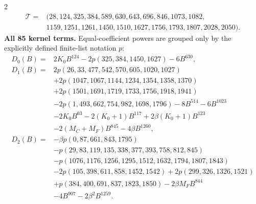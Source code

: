 \documentclass[10pt]{article}
\begin{document}
\begin{multicols}{2}
\[\begin{aligned}
\mathcal T={}&(28,124,325,384,589,630,643,696,846,1073,1082,\\
 &1159,1251,1261,1450,1510,1627,1756,1793,1807,2028,2050).
\end{aligned}
\]
\textbf{All 85 kernel terms.} Equal-coefficient powers are grouped only by
the explicitly defined finite-list notation $p$:
\[
\begin{aligned}
D_0(B)={}&2K_0B^{124}-2p(325,384,1450,1627)-6B^{630},\\
D_1(B)={}&2p(26,33,477,542,570,605,1020,1027)\\
 &+2p(1047,1067,1144,1234,1354,1358,1370)\\
 &+2p(1501,1691,1719,1733,1756,1918,1941)\\
 &-2p(1,493,662,754,982,1698,1796)-8B^{514}-6B^{1023}\\
 &-2K_0B^{63}-2(K_0+1)B^{117}+2\beta(K_0+1)B^{123}\\
 &-2(M_C+M_F)B^{845}-4\beta B^{1260},\\
D_2(B)={}&-\beta p(0,87,661,843,1795)\\
 &-p(29,83,119,135,338,377,393,758,812,845)\\
 &-p(1076,1176,1256,1295,1512,1632,1794,1807,1843)\\
 &-2p(105,398,611,858,1452,1542)+2p(299,326,1326,1521)\\
 &+p(384,400,691,837,1823,1850)-2\beta M_FB^{844}\\
 &-4B^{907}-2\beta^2B^{1259}.
\end{aligned}
\]


\end{multicols}
\end{document}
